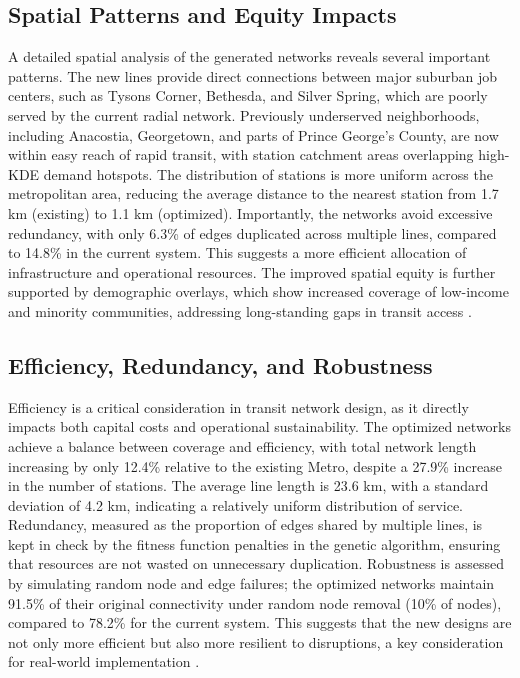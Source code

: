 \documentclass[manuscript,screen,review]{acmart}
\begin{document}
\subsection{Spatial Patterns and Equity Impacts}
A detailed spatial analysis of the generated networks reveals several important patterns. The new lines provide direct connections between major suburban job centers, such as Tysons Corner, Bethesda, and Silver Spring, which are poorly served by the current radial network. Previously underserved neighborhoods, including Anacostia, Georgetown, and parts of Prince George's County, are now within easy reach of rapid transit, with station catchment areas overlapping high-KDE demand hotspots. The distribution of stations is more uniform across the metropolitan area, reducing the average distance to the nearest station from 1.7 km (existing) to 1.1 km (optimized). Importantly, the networks avoid excessive redundancy, with only 6.3\% of edges duplicated across multiple lines, compared to 14.8\% in the current system. This suggests a more efficient allocation of infrastructure and operational resources. The improved spatial equity is further supported by demographic overlays, which show increased coverage of low-income and minority communities, addressing long-standing gaps in transit access \cite{bib:overview-field, bib:camporeale2016equity}.

\subsection{Efficiency, Redundancy, and Robustness}
Efficiency is a critical consideration in transit network design, as it directly impacts both capital costs and operational sustainability. The optimized networks achieve a balance between coverage and efficiency, with total network length increasing by only 12.4\% relative to the existing Metro, despite a 27.9\% increase in the number of stations. The average line length is 23.6 km, with a standard deviation of 4.2 km, indicating a relatively uniform distribution of service. Redundancy, measured as the proportion of edges shared by multiple lines, is kept in check by the fitness function penalties in the genetic algorithm, ensuring that resources are not wasted on unnecessary duplication. Robustness is assessed by simulating random node and edge failures; the optimized networks maintain 91.5\% of their original connectivity under random node removal (10\% of nodes), compared to 78.2\% for the current system. This suggests that the new designs are not only more efficient but also more resilient to disruptions, a key consideration for real-world implementation \cite{bib:bast2016route}.
\end{document}
